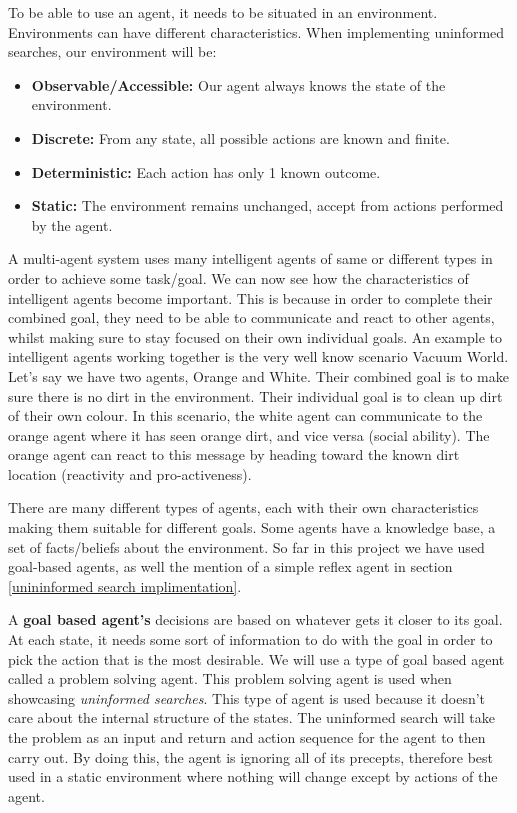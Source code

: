 \documentclass[]{final_report}
\begin{document}
To be able to use an agent, it needs to be situated in an environment. Environments can have different characteristics. When implementing uninformed searches, our environment will be:

\begin{itemize}
    \item \textbf{Observable/Accessible:} Our agent always knows the state of the environment.
    \item \textbf{Discrete:} From any state, all possible actions are known and finite.
    \item \textbf{Deterministic:} Each action has only 1 known outcome.
    \item \textbf{Static:} The environment remains unchanged, accept from actions performed by the agent.
\end{itemize}

A multi-agent system uses many intelligent agents of same or different types in order to achieve some task/goal. We can now see how the characteristics of intelligent agents become important. This is because in order to complete their combined goal, they need to be able to communicate and react to other agents, whilst making sure to stay focused on their own individual goals. An example to intelligent agents working together is the very well know scenario Vacuum World. Let's say we have two agents, Orange and White. Their combined goal is to make sure there is no dirt in the environment. Their individual goal is to clean up dirt of their own colour. In this scenario, the white agent can communicate to the orange agent where it has seen orange dirt, and vice versa (social ability). The orange agent can react to this message by heading toward the known dirt location (reactivity and pro-activeness).

There are many different types of agents, each with their own characteristics making them suitable for different goals. Some agents have a knowledge base, a set of facts/beliefs about the environment.  So far in this project we have used goal-based agents, as well the mention of a simple reflex agent in section \ref{unininformed search implimentation}.

A \textbf{goal based agent's} decisions are based on whatever gets it closer to its goal. At each state, it needs some sort of information to do with the goal in order to pick the action that is the most desirable. We will use a type of goal based agent called a problem solving agent. This problem solving agent is used when showcasing \textit{uninformed searches}. This type of agent is used because it doesn't care about the internal structure of the states. The uninformed search will take the problem as an input and return and action sequence for the agent to then carry out. By doing this, the agent is ignoring all of its precepts, therefore best used in a static environment where nothing will change except by actions of the agent\cite{russell2016artificial}.
\end{document}
